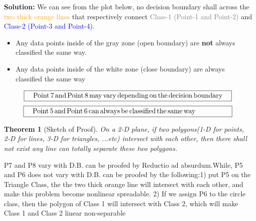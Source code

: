 \documentclass[12pt,letterpaper]{article}
\newtheorem{theorem}{Theorem}
\theoremstyle{definition}
\begin{document}
\textbf{Solution:}
We can see from the plot below, no decision boundary shall across the \textcolor{orange}{two thick orange lines} that respectively connect \textcolor{gray}{Class-1 (Point-1 and Point-2)} and \textcolor{blue}{Class-2 (Point-3 and Point-4)}.
\begin{itemize}
    \item Any data points inside of the gray zone (open boundary) are \textbf{not} always classified the same way.
    \item Any data points inside of the white zone (close boundary) are always classified the same way
\end{itemize}
\begin{equation}
    \boxed{\rm{\quad Point\,7 \, and\, Point\,8\,may\,vary\,depending\,on\,the\,decision\,boundary\quad}}
\end{equation}
\begin{equation}
    \boxed{\rm{\quad Point\,5 \, and\, Point\,6\,can\,always\,be\,classified\,the\,same\,way\quad\quad\quad\quad\quad}}
\end{equation}



\begin{theorem}[Sketch of Proof]
On a 2-D plane, if two polygons(1-D for points, 2-D for lines, 3-D for triangles, ...etc) intersect with each other, then there shall not exist any line can totally separate these two polygons. 
\end{theorem}
P7 and P8 vary with D.B. can be proofed by Reductio ad absurdum.While, P5 and P6 does not vary with D.B. can be proofed by the following:1) put P5 on the Triangle Class, the the two thick orange line will intersect with each other, and make this problem become nonlinear spreadable. 2) If we assign P6 to the circle class, then the polygon of Class 1 will intersect with Class 2, which will make Class 1 and Class 2 linear non-separable
\end{document}
